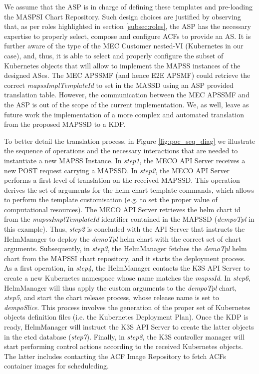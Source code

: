 We assume that the ASP is in charge of defining these templates and pre-loading the MASPSI Chart Repository. Such design choices are justified by observing that, as per roles highlighted in section \ref{subsec:roles}, the ASP has the necessary expertise to properly select, compose and configure ACFs to provide an AS. It is further aware of the type of the MEC Customer nested-VI (Kubernetes in our case), and, thus, it is able to select and properly configure the subset of Kubernetes objects that will allow to implement the MAPSS instances of the designed ASes. The MEC APSSMF (and hence E2E APSMF) could retrieve the correct \textit{mapssImplTemplateId} to set in the MASSD using an ASP provided translation table. However, the communication between the MEC APSSMF  and the ASP is out of the scope of the current implementation. We, as well, leave as future work the implementation of a more complex and automated translation from the proposed MAPSSD to a KDP.

To better detail the translation process, in Figure \ref{fig:poc_seq_diag} we illustrate the sequence of operations and the necessary interactions that are needed to instantiate a new MAPSS Instance. In \textit{step1}, the MECO API Server receives a new POST request carrying a MAPSSD. In \textit{step2}, the MECO API Server performs a first level of translation on the received MAPSSD. This operation derives the set of arguments for the helm chart template commands, which allows to perform the template customisation (e.g. to set the proper value of computational resources). The MECO API Server retrieves the helm chart id from the \textit{mapssImplTemplateId} identifier contained in the MAPSSD (\textit{dempoTpl} in this example). Thus, \textit{step2} is concluded with the API Server that instructs the HelmManager to deploy the \textit{demoTpl} helm chart with the correct set of chart arguments. Subsequently, in \textit{step3}, the HelmManager fetches the \textit{demoTpl} helm chart from the MAPSSI chart repository, and it starts the deployment process. As a first operation, in \textit{step4}, the HelmManager contacts the K3S API Server to create a new Kubernetes namespace whose name matches the \textit{mapssId}. In \textit{step6}, HelmManager will thus apply the custom arguments to the \textit{dempoTpl} chart, \textit{step5}, and start the chart release process, whose release name is set to \textit{dempoSlice}. This process involves the generation of the proper set of Kubernetes objects definition files (i.e. the Kubernetes Deployment Plan). Once the KDP is ready, HelmManager will instruct the K3S API Server to create the latter objects in the etcd database (\textit{step7}). Finally, in \textit{step8}, the K3S controller manager will start performing control actions according to the received Kubernetes objects. The latter includes contacting the ACF Image Repository to fetch ACFs container images for scheduleding.   
